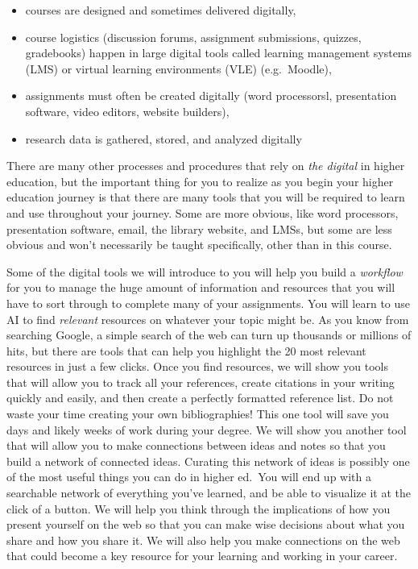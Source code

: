 \documentclass[
]{book}
\providecommand{\tightlist}{%
  \setlength{\itemsep}{0pt}\setlength{\parskip}{0pt}}
\theoremstyle{definition}
\theoremstyle{definition}
\theoremstyle{definition}
\theoremstyle{definition}
\theoremstyle{remark}
\begin{document}
\begin{itemize}
\tightlist
\item
  courses are designed and sometimes delivered digitally,
\item
  course logistics (discussion forums, assignment submissions, quizzes, gradebooks) happen in large digital tools called learning management systems (LMS) or virtual learning environments (VLE) (e.g.~Moodle),
\item
  assignments must often be created digitally (word processorsl, presentation software, video editors, website builders),
\item
  research data is gathered, stored, and analyzed digitally
\end{itemize}

There are many other processes and procedures that rely on \emph{the digital} in higher education, but the important thing for you to realize as you begin your higher education journey is that there are many tools that you will be required to learn and use throughout your journey. Some are more obvious, like word processors, presentation software, email, the library website, and LMSs, but some are less obvious and won't necessarily be taught specifically, other than in this course.

Some of the digital tools we will introduce to you will help you build a \emph{workflow} for you to manage the huge amount of information and resources that you will have to sort through to complete many of your assignments. You will learn to use AI to find \emph{relevant} resources on whatever your topic might be. As you know from searching Google, a simple search of the web can turn up thousands or millions of hits, but there are tools that can help you highlight the 20 most relevant resources in just a few clicks. Once you find resources, we will show you tools that will allow you to track all your references, create citations in your writing quickly and easily, and then create a perfectly formatted reference list. Do not waste your time creating your own bibliographies! This one tool will save you days and likely weeks of work during your degree. We will show you another tool that will allow you to make connections between ideas and notes so that you build a network of connected ideas. Curating this network of ideas is possibly one of the most useful things you can do in higher ed.~You will end up with a searchable network of everything you've learned, and be able to visualize it at the click of a button. We will help you think through the implications of how you present yourself on the web so that you can make wise decisions about what you share and how you share it. We will also help you make connections on the web that could become a key resource for your learning and working in your career.
\end{document}
